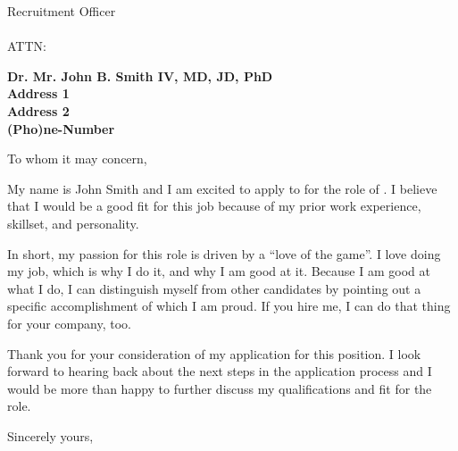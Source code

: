 \documentclass[11pt]{letter} %
\begin{document}

\begin{letter}{
  Recruitment Officer \\
  \company \\
  ATTN: \job
}


\begin{center}
\large\bf Dr. Mr. John B. Smith IV, MD, JD, PhD\\ %
Address 1\\
Address 2\\
(Pho)ne-Number %
\end{center}

\signature{Dr. John Smith} %


\opening{To whom it may concern,}

  My name is John Smith and I am excited to apply to \company for the role of \job.
  I believe that I would be a good fit for this job because of my prior work experience, skillset, and personality.

  In short, my passion for this role is driven by a ``love of the game''.
  I love doing my job, which is why I do it, and why I am good at it.
  Because I am good at what I do, I can distinguish myself from other candidates by pointing out a specific accomplishment of which I am proud.
  If you hire me, I can do that thing for your company, too.

  Thank you for your consideration of my application for this position.
  I look forward to hearing back about the next steps in the application process and I would be more than happy to further discuss my qualifications and fit for the role.


\closing{Sincerely yours,}


\end{letter}
\end{document}
